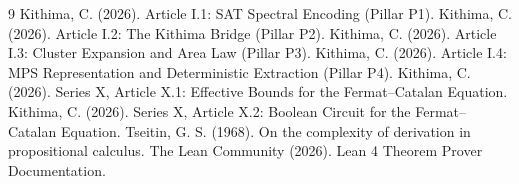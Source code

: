 \documentclass[11pt,a4paper]{article}
\begin{document}

\begin{thebibliography}{9}
  Kithima, C. (2026). Article I.1: SAT Spectral Encoding (Pillar P1).
  Kithima, C. (2026). Article I.2: The Kithima Bridge (Pillar P2).
  Kithima, C. (2026). Article I.3: Cluster Expansion and Area Law (Pillar P3).
  Kithima, C. (2026). Article I.4: MPS Representation and Deterministic Extraction (Pillar P4).
  Kithima, C. (2026). Series X, Article X.1: Effective Bounds for the Fermat–Catalan Equation.
  Kithima, C. (2026). Series X, Article X.2: Boolean Circuit for the Fermat–Catalan Equation.
  Tseitin, G. S. (1968). On the complexity of derivation in propositional calculus.
  The Lean Community (2026). Lean 4 Theorem Prover Documentation.
\end{thebibliography}
\end{document}
